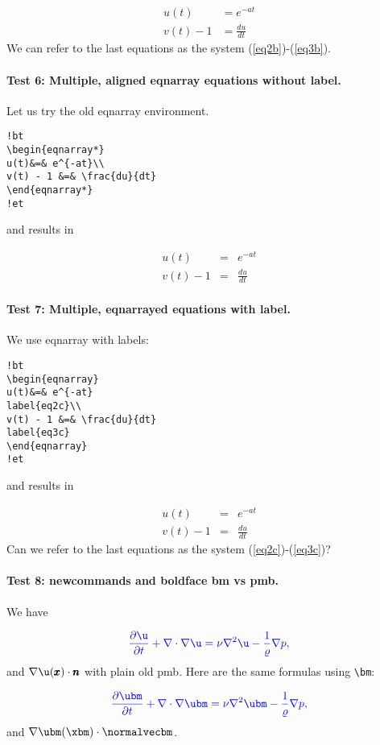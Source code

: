 \documentclass[%
oneside,                 %
final,                   %
10pt]{article}
\begin{document}
\begin{align}
u(t)&=e^{-at} \label{eq2b}\\ 
v(t) - 1 &= \frac{du}{dt} \label{eq3b}
\end{align}
We can refer to the last equations as the system (\ref{eq2b})-(\ref{eq3b}).




\paragraph{Test 6: Multiple, aligned eqnarray equations without label.}
Let us
try the old eqnarray environment.

\begin{Verbatim}[numbers=none,fontsize=\fontsize{9pt}{9pt},baselinestretch=0.95]
!bt
\begin{eqnarray*}
u(t)&=& e^{-at}\\ 
v(t) - 1 &=& \frac{du}{dt}
\end{eqnarray*}
!et
\end{Verbatim}
and results in

\begin{eqnarray*}
u(t)&=& e^{-at}\\ 
v(t) - 1 &=& \frac{du}{dt}
\end{eqnarray*}

\paragraph{Test 7: Multiple, eqnarrayed equations with label.}
We use eqnarray with
labels:

\begin{Verbatim}[numbers=none,fontsize=\fontsize{9pt}{9pt},baselinestretch=0.95]
!bt
\begin{eqnarray}
u(t)&=& e^{-at}
label{eq2c}\\ 
v(t) - 1 &=& \frac{du}{dt}
label{eq3c}
\end{eqnarray}
!et
\end{Verbatim}
and results in

\begin{eqnarray}
u(t)&=& e^{-at} \label{eq2c}\\ 
v(t) - 1 &=& \frac{du}{dt} \label{eq3c}
\end{eqnarray}
Can we refer to the last equations as the system (\ref{eq2c})-(\ref{eq3c})?

\paragraph{Test 8: newcommands and boldface bm vs pmb.}
We have

\[ \color{blue}{\frac{\partial\u}{\partial t}} +
\nabla\cdot\nabla\u = \nu\nabla^2\u -
\frac{1}{\varrho}\nabla p,\]
and $\nabla\u (\x)\cdot\normalvec$
with plain old pmb. Here are the same formulas using \Verb!\bm!:

\[ \color{blue}{\frac{\partial\ubm}{\partial t}} +
\nabla\cdot\nabla\ubm = \nu\nabla^2\ubm -
\frac{1}{\varrho}\nabla p,\]
and $\nabla\ubm (\xbm)\cdot\normalvecbm$.




\printindex
\end{document}
